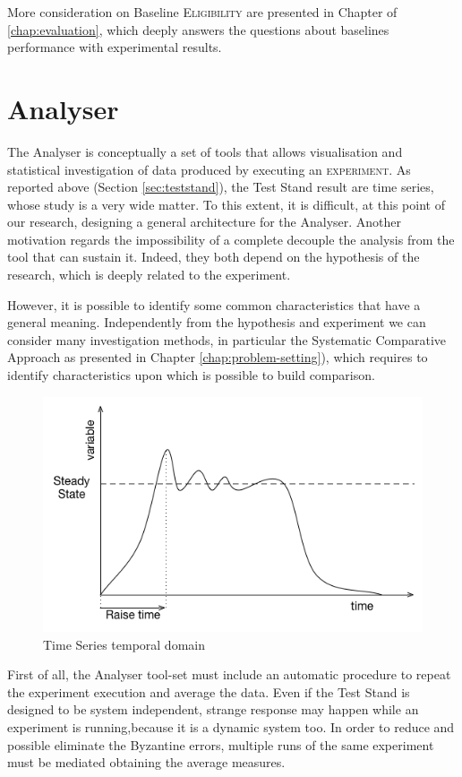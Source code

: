 More consideration on Baseline \textsc{Eligibility} are presented in Chapter of \ref{chap:evaluation}, which deeply answers the questions about baselines performance with experimental results. 

\section{Analyser}\label{sec:analyser}

The Analyser is conceptually a set of tools that allows visualisation and statistical investigation of data produced by executing an \textsc{experiment}. As reported above (Section \ref{sec:teststand}), the Test Stand result are time series, whose study is a very wide matter. To this extent, it is difficult, at this point of our research, designing a general architecture for the Analyser. Another motivation regards the impossibility of a complete decouple the analysis from the tool that can sustain it. Indeed, they both depend on the hypothesis of the research, which is deeply related to the experiment. 

However, it is possible to identify some common characteristics that have a general meaning. Independently from the hypothesis and  experiment we can consider many investigation methods, in particular the Systematic Comparative Approach as presented in Chapter \ref{chap:problem-setting}), which requires to identify characteristics upon which is possible to build comparison. 

\begin{figure}[tbh]
  \centering
	\includegraphics[width=0.5\linewidth]{images/steady-state}
	\caption{Time Series temporal domain} 	
  	\label{fig:steady-state}
\end{figure}

First of all, the Analyser tool-set must include an automatic procedure to repeat the experiment execution and average the data. Even if the Test Stand is designed to be system independent, strange response may happen while an experiment is running,because it is a dynamic system too. In order to reduce and possible eliminate the Byzantine errors, multiple runs of the same experiment must be mediated obtaining the average measures. 

